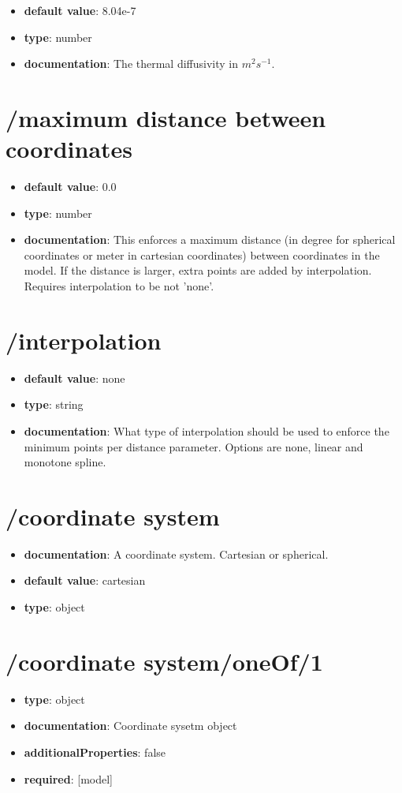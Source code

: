 \begin{itemize}\item {\bf default value}: 8.04e-7
\item {\bf type}: number
\item {\bf documentation}: The thermal diffusivity in $m^{2} s^{-1}$.
\end{itemize}\section{/maximum distance between coordinates}
\begin{itemize}\item {\bf default value}: 0.0
\item {\bf type}: number
\item {\bf documentation}: This enforces a maximum distance (in degree for spherical coordinates or meter in cartesian coordinates) between coordinates in the model. If the distance is larger, extra points are added by interpolation. Requires interpolation to be not 'none'.
\end{itemize}\section{/interpolation}
\begin{itemize}\item {\bf default value}: none
\item {\bf type}: string
\item {\bf documentation}: What type of interpolation should be used to enforce the minimum points per distance parameter. Options are none, linear and monotone spline.
\end{itemize}\section{/coordinate system}
\begin{itemize}\item {\bf documentation}: A coordinate system. Cartesian or spherical.
\item {\bf default value}: cartesian
\item {\bf type}: object
\end{itemize}
\section{/coordinate system/oneOf/1}
\begin{itemize}\item {\bf type}: object
\item {\bf documentation}: Coordinate sysetm object
\item {\bf additionalProperties}: false
\item {\bf required}: [model]\end{itemize}
